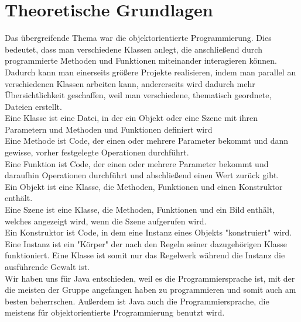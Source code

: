 \chapter{Theoretische Grundlagen}

Das übergreifende Thema war die objektorientierte Programmierung. Dies bedeutet, dass man verschiedene Klassen anlegt, die anschließend durch programmierte Methoden und Funktionen miteinander interagieren können.\\
Dadurch kann man einerseits größere Projekte realisieren, indem man parallel an verschiedenen Klassen arbeiten kann, andererseits wird dadurch mehr Übersichtlichkeit geschaffen, weil man verschiedene, thematisch geordnete, Dateien erstellt.\\
Eine Klasse ist eine Datei, in der ein Objekt oder eine Szene mit ihren Parametern und Methoden und Funktionen definiert wird\\
Eine Methode ist Code, der einen oder mehrere Parameter bekommt und dann gewisse, vorher festgelegte Operationen durchführt.\\
Eine Funktion ist Code, der einen oder mehrere Parameter bekommt und daraufhin Operationen durchführt und abschließend einen Wert zurück gibt.\\
Ein Objekt ist eine Klasse, die Methoden, Funktionen und einen Konstruktor enthält.\\
Eine Szene ist eine Klasse, die Methoden, Funktionen und ein Bild enthält, welches angezeigt wird, wenn die Szene aufgerufen wird.\\
Ein Konstruktor ist Code, in dem eine Instanz eines Objekts "konstruiert" wird.\\
Eine Instanz ist ein "Körper" der nach den Regeln seiner dazugehörigen Klasse funktioniert. Eine Klasse ist somit nur das Regelwerk während die Instanz die ausführende Gewalt ist.\\

Wir haben uns für Java entschieden, weil es die Programmiersprache ist, mit der die meisten der Gruppe angefangen haben zu programmieren und somit auch am besten beherrschen. Außerdem ist Java auch die Programmiersprache, die meistens für objektorientierte Programmierung benutzt wird.\\